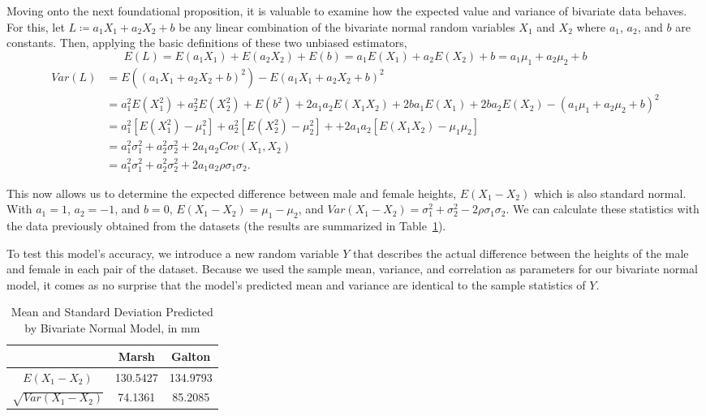 Moving onto the next foundational proposition, it is valuable to examine how the expected value and variance of bivariate data behaves.
For this, let $L\coloneqq a_1 X_1+a_2 X_2+b$ be any linear combination of the bivariate normal random variables $X_1$ and $X_2$ where $a_1$, $a_2$, and $b$ are constants.
Then, applying the basic definitions of these two unbiased estimators,
\begin{equation}
E(L)=E(a_1 X_1)+E(a_2 X_2)+E(b)=a_1 E(X_1)+a_2 E(X_2) +b=a_1\mu_1+a_2\mu_2 +b
\label{eq:derivation-of-e-l}
\end{equation}
\begin{align*}
    Var(L)&=E((a_1 X_1+a_2 X_2+b)^2)-E(a_1 X_1+a_2 X_2+b)^2\\
    &=a_1^2 E(X_1^2)+a_2^2 E(X_2^2)+E(b^2)+2a_1 a_2 E(X_1 X_2)+2ba_1 E(X_1)+2ba_2 E(X_2)-(a_1\mu_1+a_2\mu_2+b)^2\\
    &=a_1^2[E(X_1^2)-\mu_1^2]+a_2^2[E(X_2^2)-\mu_2^2]++2a_1 a_2[E(X_1 X_2)-\mu_1\mu_2]\\
    &=a_1^2\sigma_1^2+a_2^2\sigma_2^2+2a_1 a_2 Cov(X_1,X_2)\\
   &=a_1^2\sigma_1^2+a_2^2\sigma_2^2+2a_1 a_2\rho\sigma_1\sigma_2.
\end{align*}

This now allows us to determine the expected difference between male and female heights, $E(X_1-X_2)$ which is also standard normal.
With $a_1=1$, $a_2=-1$, and $b=0$, $E(X_1-X_2)=\mu_1-\mu_2$, and $Var(X_1-X_2)=\sigma_1^2+\sigma_2^2-2\rho\sigma_1\sigma_2$.
We can calculate these statistics with the data previously obtained from the datasets (the results are summarized in Table~\ref{tab:statistics-of-differences-model}).

To test this model's accuracy, we introduce a new random variable $Y$ that describes the actual difference between the heights of the male and female in each pair of the dataset.
Because we used the sample mean, variance, and correlation as parameters for our bivariate normal model, it comes as no surprise that the model's predicted mean and variance are identical to the sample statistics of $Y$.

\begin{table}[h]
    \centering
    \begin{tabular}{c|cc}
         & Marsh & Galton\\
         \midrule
        $E(X_1-X_2)$ & 130.5427 & 134.9793 \\
        $\sqrt{Var(X_1-X_2)}$ & 74.1361 & 85.2085 \\
    \end{tabular}
    \caption{Mean and Standard Deviation Predicted by Bivariate Normal Model, in mm}
    \label{tab:statistics-of-differences-model}
\end{table}

